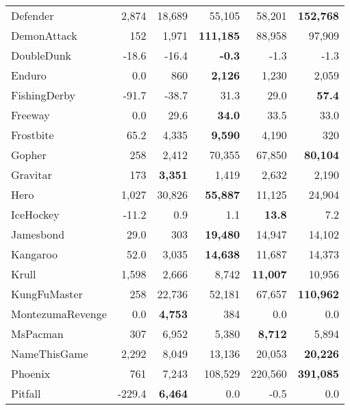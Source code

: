 \documentclass{article}
\begin{document}
\begin{table}[h]
\begin{tabular}{l r r r r r}
Defender             & 2,874      & 18,689     & 55,105     & 58,201     & \textbf{152,768} \\
DemonAttack          & 152        & 1,971      & \textbf{111,185} & 88,958     & 97,909     \\
DoubleDunk           & -18.6      & -16.4      & \textbf{-0.3} & -1.3       & -1.3       \\
Enduro               & 0.0        & 860        & \textbf{2,126} & 1,230      & 2,059      \\
FishingDerby         & -91.7      & -38.7      & 31.3       & 29.0       & \textbf{57.4} \\
Freeway              & 0.0        & 29.6       & \textbf{34.0} & 33.5       & 33.0       \\
Frostbite            & 65.2       & 4,335      & \textbf{9,590} & 4,190      & 320        \\
Gopher               & 258        & 2,412      & 70,355     & 67,850     & \textbf{80,104} \\
Gravitar             & 173        & \textbf{3,351} & 1,419      & 2,632      & 2,190      \\
Hero                 & 1,027      & 30,826     & \textbf{55,887} & 11,125     & 24,904     \\
IceHockey            & -11.2      & 0.9        & 1.1        & \textbf{13.8} & 7.2        \\
Jamesbond            & 29.0       & 303        & \textbf{19,480} & 14,947     & 14,102     \\
Kangaroo             & 52.0       & 3,035      & \textbf{14,638} & 11,687     & 14,373     \\
Krull                & 1,598      & 2,666      & 8,742      & \textbf{11,007} & 10,956     \\
KungFuMaster         & 258        & 22,736     & 52,181     & 67,657     & \textbf{110,962} \\
MontezumaRevenge     & 0.0        & \textbf{4,753} & 384        & 0.0        & 0.0        \\
MsPacman             & 307        & 6,952      & 5,380      & \textbf{8,712} & 5,894      \\
NameThisGame         & 2,292      & 8,049      & 13,136     & 20,053     & \textbf{20,226} \\
Phoenix              & 761        & 7,243      & 108,529    & 220,560    & \textbf{391,085} \\
Pitfall              & -229.4     & \textbf{6,464} & 0.0        & -0.5       & 0.0        \\

\end{tabular}
\end{table}
\end{document}
